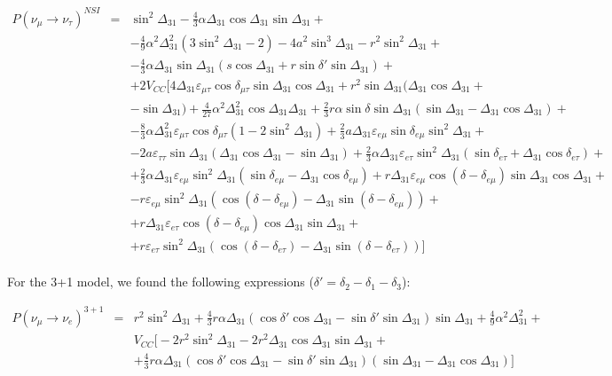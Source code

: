 \documentclass[12pt]{article}
\begin{document}
\begin{eqnarray}
 \nonumber P(\nu_\mu\to\nu_\tau)^{NSI}&=&\sin^2\Delta_{31}-\frac{4}{3}\alpha\Delta_{31}\cos\Delta_{31}\sin\Delta_{31}+ \\
 \nonumber & & -\frac{4}{9}\alpha^2\Delta_{31}^2(3\sin^2\Delta_{31}-2)-4a^2\sin^3\Delta_{31}-r^2\sin^2\Delta_{31}+\\
 \nonumber& &-\frac{4}{3}\alpha \Delta_{31}\sin\Delta_{31}(s\cos\Delta_{31}+r\sin\delta'\sin\Delta_{31})+\\
 \nonumber & &+2V_{CC}\bigg[4\Delta_{31}\varepsilon_{\mu\tau}\cos\delta_{\mu\tau}\sin\Delta_{31}\cos\Delta_{31}+r^2\sin\Delta_{31}(\Delta_{31}\cos\Delta_{31}+\\
 \nonumber & & -\sin\Delta_{31})+\frac{4}{27}\alpha^2\Delta_{31}^2\cos\Delta_{31}\Delta_{31} +\frac{2}{3}r\alpha\sin\delta\sin\Delta_{31}(\sin\Delta_{31}-\Delta_{31}\cos\Delta_{31})+\\
 \nonumber & & -\frac{8}{3}\alpha\Delta_{31}^2\varepsilon_{\mu\tau}\cos\delta_{\mu\tau}(1-2\sin^2\Delta_{31})+\frac{2}{3}a\Delta_{31}\varepsilon_{e\mu}\sin\delta_{e\mu}\sin^2\Delta_{31}+\\
 \nonumber & &-2a\varepsilon_{\tau\tau}\sin\Delta_{31}(\Delta_{31}\cos\Delta_{31}-\sin\Delta_{31})+\frac{2}{3}\alpha\Delta_{31}\varepsilon_{e\tau}\sin^2\Delta_{31}(\sin\delta_{e\tau}+\Delta_{31}\cos\delta_{e\tau})+\\
 \nonumber & & +\frac{2}{3}\alpha\Delta_{31}\varepsilon_{e\mu}\sin^2\Delta_{31}(\sin\delta_{e\mu}-\Delta_{31}\cos\delta_{e\mu})+r\Delta_{31}\varepsilon_{e\mu}\cos(\delta-\delta_{e\mu})\sin\Delta_{31}\cos\Delta_{31}+\\
 \nonumber & &-r\varepsilon_{e\mu}\sin^2\Delta_{31}(\cos(\delta-\delta_{e\mu})-\Delta_{31}\sin(\delta-\delta_{e\mu}))+\\
 \nonumber & &+ r\Delta_{31}\varepsilon_{e\tau}\cos(\delta-\delta_{e\mu})\cos\Delta_{31}\sin\Delta_{31}+\\
 & &+r\varepsilon_{e\tau}\sin^2\Delta_{31}(\cos(\delta-\delta_{e\tau})-\Delta_{31}\sin(\delta-\delta_{e\tau}))\bigg] 
\end{eqnarray}\\
For the 3+1 model, we found the following expressions ($\delta'=\delta_2-\delta_1-\delta_3$):

\begin{eqnarray}
\nonumber P(\nu_\mu\to\nu_e)^{3+1}&=& r^2\sin^2\Delta_{31}+\frac{4}{3}r\alpha\Delta_{31}(\cos\delta'\cos\Delta_{31}
-\sin\delta'\sin\Delta_{31})\sin\Delta_{31}+\frac{4}{9}\alpha^2\Delta_{31}^2+\\
\nonumber & & V_{CC}\bigg[-2r^2\sin^2\Delta_{31}-2 r^2\Delta_{31}\cos\Delta_{31}\sin\Delta_{31}+\\
& &+\frac{4}{3}r\alpha\Delta_{31}(\cos\delta'\cos\Delta_{31}-\sin\delta'\sin\Delta_{31})(\sin\Delta_{31}-\Delta_{31}\cos\Delta_{31})\bigg]
\end{eqnarray}
\end{document}
